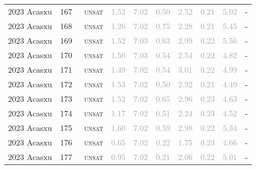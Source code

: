 \begin{center}
{\begin{longtable}{@{}llllllllll@{}}
2023 Acasxu & 167 & ~\textsc{unsat} & \textcolor{darkgray}{1.52} & \textcolor{darkgray}{7.02} & \textcolor{darkgray}{0.50} & \textcolor{darkgray}{2.52} & \textcolor{darkgray}{0.21} & \textcolor{darkgray}{5.02} & - \\
2023 Acasxu & 168 & ~\textsc{unsat} & \textcolor{darkgray}{1.26} & \textcolor{darkgray}{7.02} & \textcolor{darkgray}{0.75} & \textcolor{darkgray}{2.28} & \textcolor{darkgray}{0.21} & \textcolor{darkgray}{5.45} & - \\
2023 Acasxu & 169 & ~\textsc{unsat} & \textcolor{darkgray}{1.52} & \textcolor{darkgray}{7.03} & \textcolor{darkgray}{0.63} & \textcolor{darkgray}{2.99} & \textcolor{darkgray}{0.22} & \textcolor{darkgray}{5.56} & - \\
2023 Acasxu & 170 & ~\textsc{unsat} & \textcolor{darkgray}{1.50} & \textcolor{darkgray}{7.03} & \textcolor{darkgray}{0.54} & \textcolor{darkgray}{2.54} & \textcolor{darkgray}{0.22} & \textcolor{darkgray}{4.82} & - \\
2023 Acasxu & 171 & ~\textsc{unsat} & \textcolor{darkgray}{1.49} & \textcolor{darkgray}{7.02} & \textcolor{darkgray}{0.54} & \textcolor{darkgray}{3.01} & \textcolor{darkgray}{0.22} & \textcolor{darkgray}{4.99} & - \\
2023 Acasxu & 172 & ~\textsc{unsat} & \textcolor{darkgray}{1.53} & \textcolor{darkgray}{7.02} & \textcolor{darkgray}{0.50} & \textcolor{darkgray}{2.92} & \textcolor{darkgray}{0.21} & \textcolor{darkgray}{4.49} & - \\
2023 Acasxu & 173 & ~\textsc{unsat} & \textcolor{darkgray}{1.52} & \textcolor{darkgray}{7.02} & \textcolor{darkgray}{0.65} & \textcolor{darkgray}{2.96} & \textcolor{darkgray}{0.23} & \textcolor{darkgray}{4.63} & - \\
2023 Acasxu & 174 & ~\textsc{unsat} & \textcolor{darkgray}{1.17} & \textcolor{darkgray}{7.02} & \textcolor{darkgray}{0.51} & \textcolor{darkgray}{2.24} & \textcolor{darkgray}{0.23} & \textcolor{darkgray}{4.52} & - \\
2023 Acasxu & 175 & ~\textsc{unsat} & \textcolor{darkgray}{1.60} & \textcolor{darkgray}{7.02} & \textcolor{darkgray}{0.59} & \textcolor{darkgray}{2.98} & \textcolor{darkgray}{0.22} & \textcolor{darkgray}{5.34} & - \\
2023 Acasxu & 176 & ~\textsc{unsat} & \textcolor{darkgray}{0.65} & \textcolor{darkgray}{7.02} & \textcolor{darkgray}{0.22} & \textcolor{darkgray}{1.75} & \textcolor{darkgray}{0.23} & \textcolor{darkgray}{4.66} & - \\
2023 Acasxu & 177 & ~\textsc{unsat} & \textcolor{darkgray}{0.95} & \textcolor{darkgray}{7.02} & \textcolor{darkgray}{0.21} & \textcolor{darkgray}{2.06} & \textcolor{darkgray}{0.22} & \textcolor{darkgray}{5.01} & - \\

\end{longtable}}
\end{center}
